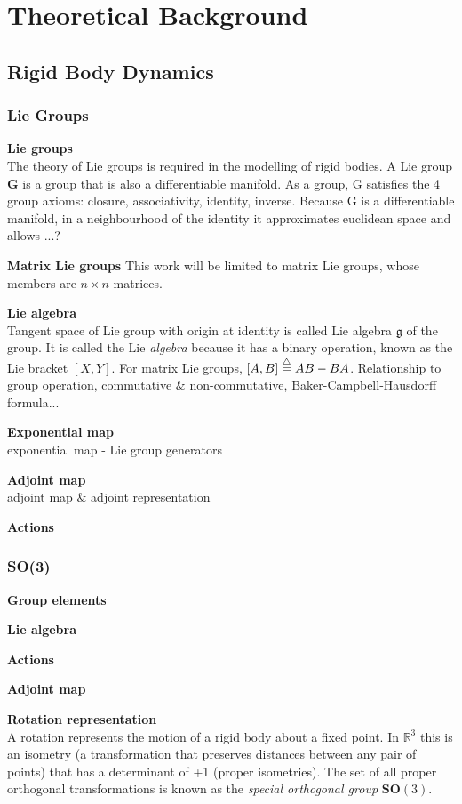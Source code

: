 \section{Theoretical Background}

\subsection{Rigid Body Dynamics}
	\subsubsection{Lie Groups}		
		\textbf{Lie groups}\\
		The theory of Lie groups is required in the modelling of rigid bodies.
		A Lie group $\mathbf{G}$ is a group that is also a differentiable manifold.
		As a group, G satisfies the 4 group axioms: closure, associativity, identity, inverse. 
		Because G is a differentiable manifold, in a neighbourhood of the identity it approximates euclidean space and allows ...?
		
		\textbf{Matrix Lie groups}
		This work will be limited to matrix Lie groups, whose members  are $n \times n$ matrices.
		
		\textbf{Lie algebra}\\
		Tangent space of Lie group with origin at identity is called Lie algebra $\mathfrak{g} $ of the group. It is called the Lie \textit{algebra} because it has a binary operation, known as the Lie bracket $[X,Y]$. For matrix Lie groups, $[A,B] \buildrel\triangle\over = AB-BA$. Relationship to group operation, commutative \& non-commutative, Baker-Campbell-Hausdorff formula...
		
		\textbf{Exponential map}\\		
		exponential map - Lie group generators
			
		\textbf{Adjoint map}\\			
		adjoint map \& adjoint representation
		
		\textbf{Actions}
		
	\subsubsection{\textbf{SO}(3)}
		\textbf{Group elements}
		
		\textbf{Lie algebra}
		
		\textbf{Actions}
		
		\textbf{Adjoint map}
		
		\textbf{Rotation representation}\\
		A rotation represents the motion of a rigid body about a fixed point. In $\mathbb{R}^3$ this is an isometry (a transformation that preserves distances between any pair of points) that has a determinant of +1 (proper isometries). The set of all proper orthogonal transformations is known as the \textit{special orthogonal group} $\textbf{SO}(3)$.
		
